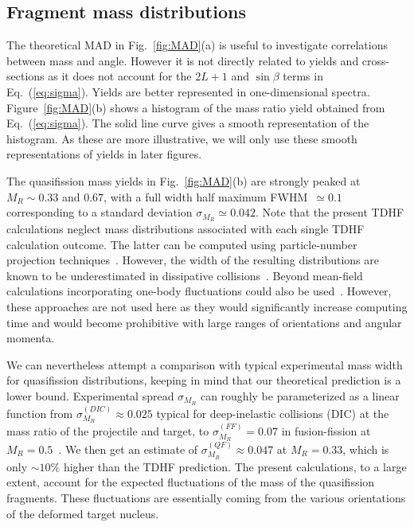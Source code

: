 \subsection{Fragment mass distributions}

The theoretical MAD in Fig.~\ref{fig:MAD}(a) is useful to investigate correlations between mass and angle. However it is not directly related to yields and cross-sections as it does not account for the $2L+1$ and $\sin\beta$ terms in Eq.~(\ref{eq:sigma}).
Yields are better represented in one-dimensional spectra.
Figure~\ref{fig:MAD}(b) shows a histogram of the mass ratio yield obtained from Eq.~(\ref{eq:sigma}).
The solid line curve gives a smooth representation of the histogram.
As these are more illustrative, we will only use these smooth representations of yields in later figures.

The quasifission mass yields in Fig.~\ref{fig:MAD}(b) are strongly peaked at $M_R\sim0.33$ and $0.67$,
with a full width half maximum FWHM~$\simeq0.1$ corresponding to a standard deviation $\sigma_{M_R}\simeq0.042$.
Note that the present TDHF calculations neglect mass distributions associated with each single TDHF calculation outcome.
The latter can be computed using particle-number projection techniques~\citep{simenel2010,sekizawa2013,scamps2013a,scamps2017b}.
However, the width of the resulting distributions are known to be underestimated in dissipative collisions~\citep{dasso1979}.
Beyond mean-field calculations incorporating one-body
fluctuations could also be used~\citep{simenel2011,williams2018,lacroix2014,ayik2015,ayik2015a,ayik2016,ayik2018,tanimura2017}.
However, these approaches are not used here as they would significantly increase computing time and would become prohibitive with large ranges of orientations and angular momenta.

We can nevertheless attempt a comparison with typical experimental mass width for quasifission distributions, keeping in mind that our theoretical prediction is a lower bound.
Experimental spread $\sigma_{M_R}$ can roughly be parameterized as a linear function from $\sigma_{M_R}^{(DIC)}\approx0.025$ typical for deep-inelastic collisions (DIC) at the mass ratio of the projectile and target, to $\sigma_{M_R}^{(FF)}=0.07$ in fusion-fission at $M_R=0.5$~\citep{durietz2011}.
We then get an estimate of $\sigma_{M_R}^{(QF)}\approx 0.047$ at $M_R=0.33$, which is only $\sim10\%$ higher than the TDHF prediction.
The present calculations, to a large extent, account for the expected fluctuations of the mass of the quasifission fragments.
These fluctuations are essentially coming from the various orientations of the deformed target nucleus.

